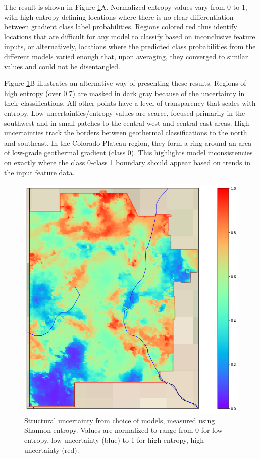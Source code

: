 The result is shown in Figure \ref{fig:structural_entropy_map}A. Normalized entropy values vary from 0 to 1, with high entropy defining locations where there is no clear differentiation between gradient class label probabilities. Regions colored red thus identify locations that are difficult for any model to classify based on inconclusive feature inputs, or alternatively, locations where the predicted class probabilities from the different models varied enough that, upon averaging, they converged to similar values and could not be disentangled.

Figure \ref{fig:structural_entropy_map}B illustrates an alternative way of presenting these results. Regions of high entropy (over 0.7) are masked in dark gray because of the uncertainty in their classifications. All other points have a level of transparency that scales with entropy. Low uncertainties/entropy values are scarce, focused primarily in the southwest and in small patches to the central west and central east areas. High uncertainties track the borders between geothermal classifications to the north and southeast. In the Colorado Plateau region, they form a ring around an area of low-grade geothermal gradient (class 0). This highlights model inconsistencies on exactly where the class 0-class 1 boundary should appear based on trends in the input feature data.

\begin{figure}[!htp]
\centering
\includegraphics[width=.8\textwidth]{templates/images/Figure-Structural_Entropy_Map.png}
\caption[Structural uncertainty map]{Structural uncertainty from choice of models, measured using Shannon entropy. Values are normalized to range from 0 for low entropy, low uncertainty (blue) to 1 for high entropy, high uncertainty (red).}
\label{fig:structural_entropy_map}
\end{figure}

